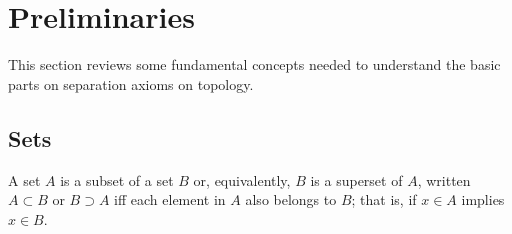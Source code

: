 \documentclass[12pt]{article} %
\begin{document}









\pagestyle{empty} %
\newpage
\tableofcontents %


\pagestyle{fancy} %


\newpage
\section{Preliminaries}
This section reviews some fundamental concepts needed to understand the basic parts on separation axioms on topology. 

\subsection{Sets}
\begin{definition}[Subset]\parencite{lipschutz1965} A set $A$ is a subset of a set $B$ or, equivalently, $B$ is a superset of $A$, written $A\subset B$ or $B\supset A$ iff each element in $A$ also belongs to $B$; that is, if $x\in A$ implies $x\in B$.
\end{definition}
\end{document}
